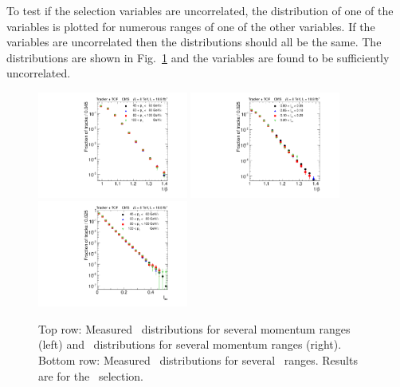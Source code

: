 To test if the selection variables are uncorrelated, the distribution of one of the variables is plotted for numerous ranges of one of the other variables.
If the variables are uncorrelated then the distributions should all be the same. 
The distributions are shown in Fig.~\ref{fig:correlation} and the variables are found to be sufficiently uncorrelated.

\begin{figure}%
\begin{center}
\includegraphics[clip=true, trim=0.0cm 0cm 3.0cm 0cm, width=0.44\textwidth]{figures/tkmu/Control_Data8TeV_Pt_TOFSpectrum}
\includegraphics[clip=true, trim=0.0cm 0cm 3.0cm 0cm, width=0.44\textwidth]{figures/tkmu/Control_Data8TeV_Is_TOFSpectrumLog}
\includegraphics[clip=true, trim=0.0cm 0cm 3.0cm 0cm, width=0.44\textwidth]{figures/tkmu/Control_Data8TeV_Pt_IsSpectrum}
\caption[Distribution of selection variables in the \tktof\ analysis for different ranges of the other variables]
{Top row: Measured \ias\ distributions for several momentum ranges (left)
and \invbeta\ distributions for several momentum ranges (right). Bottom row:  Measured \invbeta\ distributions for several \ias\  ranges.
Results are for the \tktof\ selection.}
\label{fig:correlation}
\end{center}
\end{figure}

